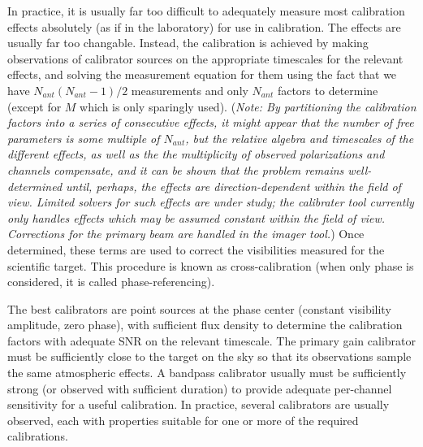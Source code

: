 In practice, it is usually far too difficult to adequately measure
most calibration effects absolutely (as if in the laboratory) for use
in calibration. The effects are usually far too changable. Instead,
the calibration is achieved by making observations of calibrator
sources on the appropriate timescales for the relevant effects, and
solving the measurement equation for them using the fact that we have
$N_{ant}(N_{ant}-1)/2$ measurements and only $N_{ant}$ factors to
determine (except for $M$ which is only sparingly used). ({\it Note: By
partitioning the calibration factors into a series of consecutive
effects, it might appear that the number of free parameters is some
multiple of $N_{ant}$, but the relative algebra and timescales of the
different effects, as well as the the multiplicity of observed
polarizations and channels compensate, and it can be shown that the
problem remains well-determined until, perhaps, the effects are
direction-dependent within the field of view. Limited solvers for such
effects are under study; the calibrater tool currently only handles
effects which may be assumed constant within the field of
view. Corrections for the primary beam are handled in the imager
tool.}) Once determined, these terms are used to correct the
visibilities measured for the scientific target. This procedure is
known as cross-calibration (when only phase is considered, it is
called phase-referencing). 

The best calibrators are point sources at the phase center (constant
visibility amplitude, zero phase), with sufficient flux density to
determine the calibration factors with adequate SNR on the relevant
timescale. The primary gain calibrator must be sufficiently close to
the target on the sky so that its observations sample the same
atmospheric effects. A bandpass calibrator usually must be
sufficiently strong (or observed with sufficient duration) to provide
adequate per-channel sensitivity for a useful calibration. In
practice, several calibrators are usually observed, each with
properties suitable for one or more of the required calibrations. 

